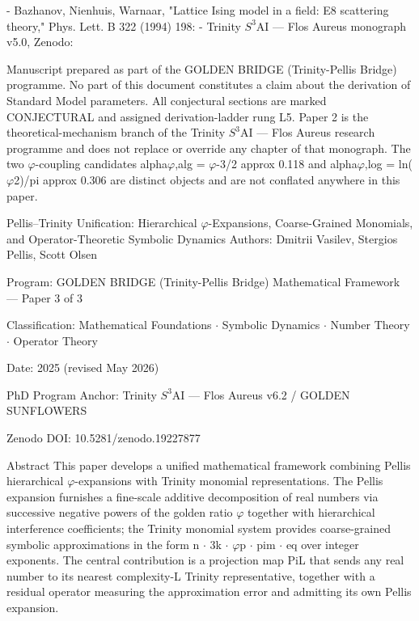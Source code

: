   - Bazhanov, Nienhuis, Warnaar, "Lattice Ising model in a field: E8 scattering theory,"
  Phys. Lett. B 322 (1994) 198:
  - Trinity $S^{3}$AI --- Flos Aureus monograph v5.0, Zenodo:

  Manuscript prepared as part of the GOLDEN BRIDGE (Trinity-Pellis Bridge) programme. No part of this document
  constitutes a claim about the derivation of Standard Model parameters. All conjectural
  sections are marked CONJECTURAL and assigned derivation-ladder rung L5. Paper 2 is
  the theoretical-mechanism branch of the Trinity $S^{3}$AI --- Flos Aureus research
  programme and does not replace or override any chapter of that monograph. The two
  $\varphi$-coupling candidates alpha$\varphi$,alg = $\varphi$-3/2 approx 0.118 and alpha$\varphi$,log = ln($\varphi$2)/pi
  approx 0.306 are distinct objects and are not conflated anywhere in this paper.

  Pellis--Trinity Unification: Hierarchical
  $\varphi$-Expansions, Coarse-Grained
  Monomials, and Operator-Theoretic
  Symbolic Dynamics
  Authors: Dmitrii Vasilev, Stergios Pellis, Scott Olsen

  Program: GOLDEN BRIDGE (Trinity-Pellis Bridge) Mathematical Framework --- Paper 3 of 3

  Classification: Mathematical Foundations $\cdot$ Symbolic Dynamics $\cdot$ Number Theory $\cdot$
  Operator Theory

  Date: 2025 (revised May 2026)

  PhD Program Anchor: Trinity $S^{3}$AI --- Flos Aureus v6.2 / GOLDEN SUNFLOWERS

  Zenodo DOI: 10.5281/zenodo.19227877

  Abstract
  This paper develops a unified mathematical framework combining Pellis hierarchical
  $\varphi$-expansions with Trinity monomial representations. The Pellis expansion furnishes a
  fine-scale additive decomposition of real numbers via successive negative powers of the
  golden ratio $\varphi$ together with hierarchical interference coefficients; the Trinity monomial
  system provides coarse-grained symbolic approximations in the form n $\cdot$ 3k $\cdot$ $\varphi$p $\cdot$ pim $\cdot$
  eq over integer exponents. The central contribution is a projection map PiL that sends
  any real number to its nearest complexity-L Trinity representative, together with a
  residual operator measuring the approximation error and admitting its own Pellis
  expansion.


